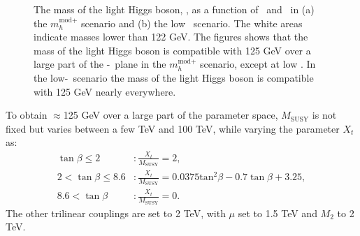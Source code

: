 \begin{figure}[h!]
\begin{center}
\end{center}
\caption{The mass of the light Higgs boson, \mh, as a function 
of \mA~and \tanb~in (a) the $m_{h}^{\text{mod+}}$ scenario and (b) the low \tanb~scenario. The white areas
indicate masses lower than 122 GeV. The figures shows that
the mass of the light Higgs boson is compatible with 125 GeV over a large
part of the \mA-\tanb~plane in the $m_{h}^{\text{mod+}}$ scenario, except at low \tanb. In the low-\tanb~scenario
the mass of the light Higgs boson is compatible with 125 GeV nearly everywhere.}
\label{fig:mhmodp_mh}
\end{figure}
To obtain \mh$\approx$125 GeV over a large part of the parameter
space, 
$M_{\text{SUSY}}$ is not fixed but varies between a few TeV and 100 TeV, while
varying the parameter $X_t$ as:
\begin{equation}
\begin{split}
\tan{\beta} \leq 2 &: \frac{X_t}{M_{\text{SUSY}}} = 2,\\
2 < \tan{\beta} \leq 8.6 &: \frac{X_t}{M_{\text{SUSY}}} = 0.0375\text{tan}^2\beta - 0.7\tan{\beta} + 3.25,\\
8.6 < \tan{\beta} &: \frac{X_t}{M_{\text{SUSY}}} = 0.
\end{split}
\end{equation}
The other trilinear couplings are set to 2 TeV, with $\mu$ set to 1.5 TeV and $M_2$ to 2 TeV.

